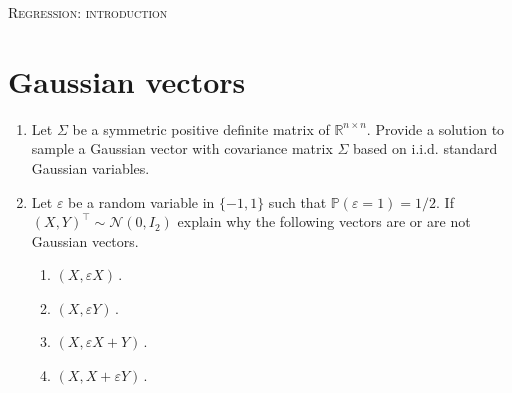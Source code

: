 \documentclass[a4paper,10pt,fleqn]{article}
\newcommand{\eqsp}{\,}
\newcommand{\rset}{\ensuremath{\mathbb{R}}}
\newcommand{\bP}{\mathbb{P}}
\newcommand{\X}{\ensuremath{\mathcal{X}}}
\newcommand{\1}{\ensuremath{\mathbbm{1}}}
\begin{document}

\noindent\hrulefill

\begin{center}
\textsc{Regression: introduction}
\end{center}
\hrulefill

\medskip


\section*{Gaussian vectors}
\begin{enumerate}
\item Let $\Sigma$ be a symmetric positive definite matrix of $\rset^{n\times n}$. Provide a solution to sample a Gaussian vector with covariance matrix $\Sigma$ based on i.i.d. standard Gaussian variables.

%

\item Let $\varepsilon$ be a random variable in $\{-1,1\}$ such that $\bP(\varepsilon = 1) = 1/2$. If $(X,Y)^\top\sim \mathcal{N}(0,I_2)$ explain why the following vectors are or are not Gaussian vectors.
\begin{enumerate}
\item $(X,\varepsilon X)$\eqsp.

\item $(X,\varepsilon Y)$\eqsp.

\item $(X,\varepsilon X + Y)$\eqsp.

\item $(X,X + \varepsilon Y)$\eqsp.

\end{enumerate}



\end{enumerate}
\end{document}

